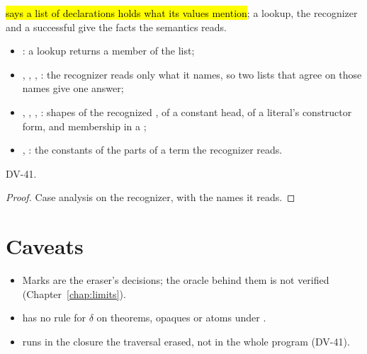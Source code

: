 \begin{lemma}
  \label{lem:EraseProof-DepClosed}
  \leanok
   \hl{ says a list of declarations holds what its values mention}; a lookup, the  recognizer and a successful  give the facts the semantics reads.
  \begin{itemize}
  \item {}: a lookup returns a member of the list;
  \item {}, , , : the recognizer reads only what it names, so two lists that agree on those names give one answer;
  \item {}, , , : shapes of the recognized , of a constant head, of a literal's constructor form, and membership in a ;
  \item {}, : the constants of the parts of a term the recognizer reads.
  \end{itemize}
   DV-41.
\end{lemma}
\begin{proof}
  \leanok
   Case analysis on the recognizer, with the names it reads.
\end{proof}

\section*{Caveats}
\begin{itemize}
\item Marks are the eraser's decisions; the oracle behind them is not verified (Chapter~\ref{chap:limits}).
\item {} has no rule for $\delta$ on theorems, opaques or  atoms under .
\item {} runs in the closure the traversal erased, not in the whole program (DV-41).
\end{itemize}
